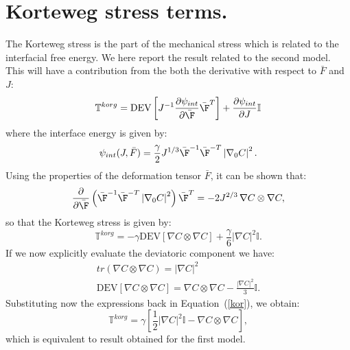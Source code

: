 \section{Korteweg stress terms.}
The Korteweg stress is the part of the mechanical stress which is related to the interfacial free energy. We here report the result related to the second model. This will have a contribution from the both the derivative with respect to $\bar{F}$ and $J$:
\begin{equation}
\mathbb{T}^{korg} = \text{DEV}\left[J^{-1}\frac{\partial \psi_{int}}{\partial \bar{\F}}\bar{\F}^T\right] + \frac{\partial \psi_{int}}{\partial J} \mathbb{I}
\end{equation}
where the interface energy is given by:
\begin{equation}
\psi_{int}(J,\bar{F}) = \frac{\gamma}{2} J^{1/3} \bar{\F}^{-1}\bar{\F}^{-T} \left|\nabla_0 C\right|^2.
\end{equation}
Using the properties of the deformation tensor $\bar{F}$, it can be shown that:
\begin{equation}
\frac{\partial }{\partial \bar{\F}} \left(\bar{\F}^{-1} \bar{\F}^{-T} \left|\nabla_0 C\right|^2\right) \bar{\F}^T = -2 J^{2/3} \,\nabla C \otimes \nabla C,
\end{equation} 
so that the Korteweg stress is given by:
\begin{equation}
\mathbb{T}^{korg} = - \gamma \text{DEV} \left[ \nabla C \otimes \nabla C\right] + \frac{\gamma}{6} \left|\nabla C\right|^2 \mathbb{I}.
\label{kor}
\end{equation}
If we now explicitly evaluate the deviatoric component we have:
\begin{equation*}
\begin{aligned}
tr(\nabla C \otimes \nabla C) = \left|\nabla C\right|^2 \\ \text{DEV}\left[\nabla C \otimes \nabla C\right] = \nabla C \otimes \nabla C -\frac{\left|\nabla C\right|^2}{3} \mathbb{I}.
\end{aligned}
\end{equation*}
Substituting now the expressions back in Equation~(\ref{kor}), we obtain:
\begin{equation}
\mathbb{T}^{korg} = \gamma \left[\frac{1}{2} \left|\nabla C\right|^2 \mathbb{I} - \nabla C \otimes \nabla C\right],
\end{equation}
which is equivalent to result obtained for the first model.

